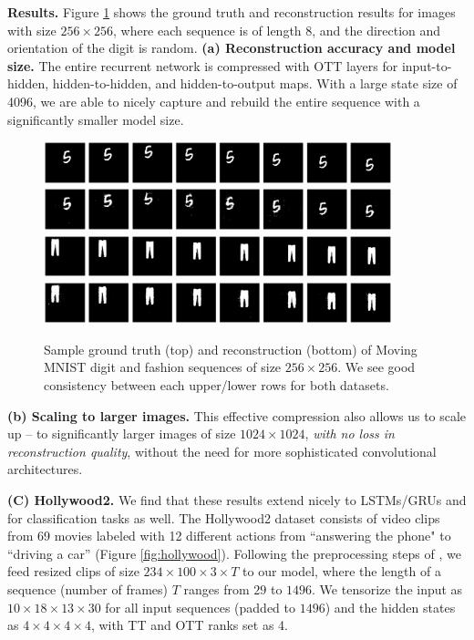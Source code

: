 {\bf Results.} Figure \ref{fig:256digits} shows the ground truth and reconstruction
results for images with size $256 \times 256$, where each sequence is of length 8,
and the direction and orientation of the digit is random.
{\bf (a) Reconstruction accuracy and model size.}
The entire recurrent network is compressed with OTT layers for input-to-hidden, hidden-to-hidden,
and hidden-to-output maps. With a large state size of 4096, we are able to nicely capture and
rebuild the entire sequence with a significantly smaller model size.
\begin{figure}[]
    \centering
    \includegraphics[width=0.9\textwidth,trim={0 1.5cm 0 1cm},clip]{4_ott/figs/mnist/DMNIST_gt.eps}
    \includegraphics[width=0.9\textwidth,trim={0 1cm 0 1.5cm},clip]{4_ott/figs/mnist/DMNIST_pd.eps}
    \includegraphics[width=0.9\textwidth,trim={0 1.5cm 0 1cm},clip]{4_ott/figs/mnist/FMNIST_gt.eps}
    \includegraphics[width=0.9\textwidth,trim={0 1cm 0 1.5cm},clip]{4_ott/figs/mnist/FMNIST_pd.eps}
    \vspace{-10pt}
    \caption{    \label{fig:256digits} \footnotesize Sample ground truth (top) and reconstruction (bottom) of Moving MNIST digit and fashion sequences of size $256 \times 256$. We
    see good consistency between each upper/lower rows for both datasets.}
\end{figure}
    {\bf (b) Scaling to larger images.} This effective compression also allows us to scale up --  to
    significantly larger images of size $1024 \times 1024$, \textit{with no loss in reconstruction quality},
    without the need for more sophisticated convolutional architectures.

    \textbf{(C) Hollywood2.} We find
    that these results extend nicely to LSTMs/GRUs and for classification tasks
    as well. The Hollywood2 dataset \cite{marszalek09} consists of video clips from 69 movies
    labeled with 12 different actions from ``answering the phone" to ``driving a car'' (Figure \ref{fig:hollywood}).
    Following the preprocessing steps of \cite{pmlr-v70-yang17e}, we feed resized
    clips of size $234 \times 100 \times 3 \times T$ to our model, where the length of a sequence
    (number of frames) $T$ ranges from $29$ to $1496$. We tensorize the
    input as $10 \times 18 \times 13 \times 30$ for all input sequences (padded to $1496$) and the
    hidden states as $4 \times 4 \times 4 \times 4$, with TT and OTT ranks set as 4.

